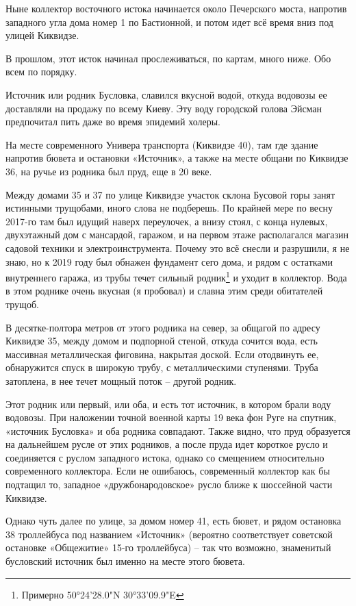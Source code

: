Ныне коллектор восточного истока начинается около Печерского моста, напротив западного угла дома номер 1 по Бастионной, и потом идет всё время вниз под улицей Киквидзе. 

В прошлом, этот исток начинал прослеживаться, по картам, много ниже. Обо всем по порядку.

Источник или родник Бусловка, славился вкусной водой, откуда водовозы ее доставляли на продажу по всему Киеву. Эту воду городской голова Эйсман предпочитал пить даже во время эпидемий холеры.

На месте современного Универа транспорта (Киквидзе 40), там где здание напротив бювета и остановки «Источник», а также на месте общани по Киквидзе 36,  на ручье из родника был пруд, еще в 20 веке.  

Между домами 35 и 37 по улице Киквидзе участок склона Бусовой горы занят истинными трущобами, иного слова не подберешь. По крайней мере по весну 2017-го там был идущий наверх переулочек, а внизу стоял, с конца нулевых, двухэтажный дом с мансардой, гаражом, и на первом этаже располагался магазин садовой техники и электроинструмента. Почему это всё снесли и разрушили, я не знаю, но к 2019 году был обнажен фундамент сего дома, и рядом с остатками внутреннего гаража, из трубы течет сильный родник\footnote{Примерно 50°24'28.0"N 30°33'09.9"E} и уходит в коллектор. Вода в этом роднике очень вкусная (я пробовал) и славна этим среди обитателей трущоб.

В десятке-полтора метров от этого родника на север, за общагой по адресу Киквидзе 35, между домом и подпорной стеной, откуда сочится вода, есть массивная металлическая фиговина, накрытая доской. Если отодвинуть ее, обнаружится спуск в широкую трубу, с металлическими ступенями. Труба затоплена, в нее течет мощный поток – другой родник.

Этот родник или первый, или оба, и есть тот источник, в котором брали воду водовозы. При наложении точной военной карты 19 века фон Руге на спутник, «источник Бусловка» и оба родника совпадают. Также видно, что пруд образуется на дальнейшем русле от этих родников, а после пруда идет короткое русло и соединяется с руслом западного истока, однако со смещением относительно современного коллектора. Если не ошибаюсь, современный коллектор как бы подтащил то, западное «дружбонародовское» русло ближе к шоссейной части Киквидзе.

Однако чуть далее по улице, за домом номер 41, есть бювет, и рядом остановка 38 троллейбуса под названием «Источник» (вероятно соответствует советской остановке «Общежитие» 15-го троллейбуса) – так что возможно, знаменитый бусловский источник был именно на месте этого бювета.

